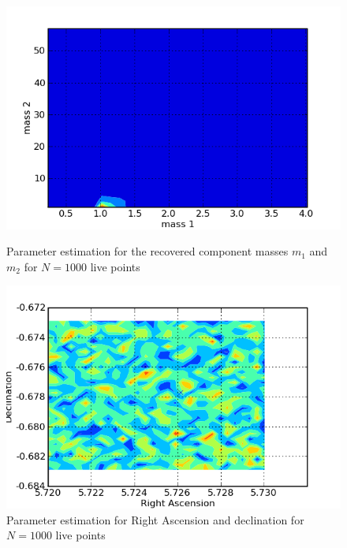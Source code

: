 \documentclass[epsf]{article}
\begin{document}
\begin{figure}[h!]
\begin{minipage}[b]{0.5\linewidth}
\centering
\includegraphics[scale=0.40]{m1m2_1000.png}
\caption{Parameter estimation for the recovered component masses $m_1$ and $m_2$ for $N=1000$ live points}
\label{fig:figure63}
\end{minipage}
\hspace{0.5cm}
\begin{minipage}[b]{0.5\linewidth}
\centering
\includegraphics[scale=0.40]{RAdec_1000.png}
\caption{Parameter estimation for Right Ascension and declination for $N=1000$ live points}
\label{fig:figure64}
\end{minipage}
\end{figure}
\end{document}
